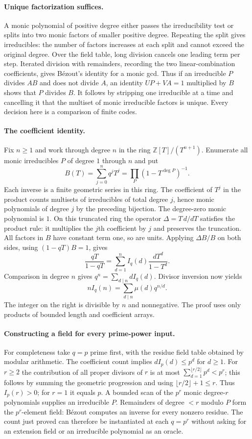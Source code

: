 \paragraph{Unique factorization suffices.}
A monic polynomial of positive degree either passes the irreducibility
test or splits into two monic factors of smaller positive degree. Repeating
the split gives irreducibles: the number of factors increases at each
split and cannot exceed the original degree. Over the field table,
long division cancels one leading term per step. Iterated division with
remainders, recording the two linear-combination coefficients, gives
B\'ezout's identity for a monic gcd. Thus if an irreducible $P$ divides
$AB$ and does not divide $A$, an identity $UP+VA=1$ multiplied by $B$
shows that $P$ divides $B$. It follows by stripping one irreducible at
a time and cancelling it that the multiset of monic irreducible factors
is unique. Every decision here is a comparison of finite codes.

\paragraph{The coefficient identity.}
Fix $n\ge1$ and work through degree $n$ in the ring
$\mathbb Z[T]/(T^{n+1})$. Enumerate all monic irreducibles $P$ of
degree $1$ through $n$ and put
\[
  B(T)=\sum_{j=0}^{n}q^jT^j
     =\prod_P (1-T^{\deg P})^{-1}.
\]
Each inverse is a finite geometric series in this ring. The coefficient
of $T^j$ in the product counts multisets of irreducibles of total degree
$j$, hence monic polynomials of degree $j$ by the preceding bijection.
The degree-zero monic polynomial is $1$. On this truncated ring the operator
$\Delta=T\,d/dT$ satisfies the product rule: it multiplies the $j$th
coefficient by $j$ and preserves the truncation. All factors in $B$ have
constant term one, so are units. Applying $\Delta B/B$ on both sides,
using $(1-qT)B=1$, gives
\[
  \frac{qT}{1-qT}
     =\sum_{d=1}^n I_q(d)\frac{dT^d}{1-T^d}.
\]
Comparison in degree $n$ gives $q^n=\sum_{d\mid n} d I_q(d)$.
Divisor inversion now yields
\[
             n I_q(n)=\sum_{d\mid n}\mu(d)q^{n/d}.
\]
The integer on the right is divisible by $n$ and nonnegative.
The proof uses only products of bounded length and coefficient arrays.

\paragraph{Constructing a field for every prime-power input.}
For completeness take $q=p$ prime first, with the residue field table
obtained by modular arithmetic. The coefficient count implies
$d I_p(d)\le p^d$ for $d\ge1$. For $r\ge2$ the contribution of all
proper divisors of $r$ is at most
$\sum_{d=1}^{\lfloor r/2\rfloor}p^d<p^r$; this follows by summing the
geometric progression and using $\lfloor r/2\rfloor+1\le r$.
Thus $I_p(r)>0$; for $r=1$ it equals $p$. A bounded scan of the $p^r$
monic degree-$r$ polynomials supplies an irreducible $P$. Remainders
of degree $<r$ modulo $P$ form the $p^r$-element field: B\'ezout
computes an inverse for every nonzero residue. The count just proved
can therefore be instantiated at each $q=p^r$ without asking for an
extension field or an irreducible polynomial as an oracle.


